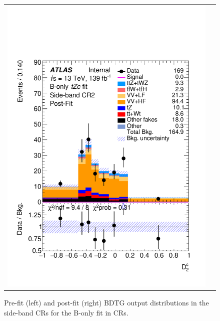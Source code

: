 \begin{figure}[htbp]
\begin{tabular}{cc}
		\includegraphics[width=.45\textwidth]{Chapters/CH7/figures/BONLY_CR_UsingDL1rcFullSys/Plots/SBCR2_postFit} \\
	\end{tabular}
	\caption{Pre-fit (left) and post-fit (right) BDTG output distributions in the side-band CRs for the B-only \tZc fit in CRs.
		\ErrStatSys
	}%
	\label{fig:stat:tzc:bonly:cr:crplots:1}
\end{figure}

